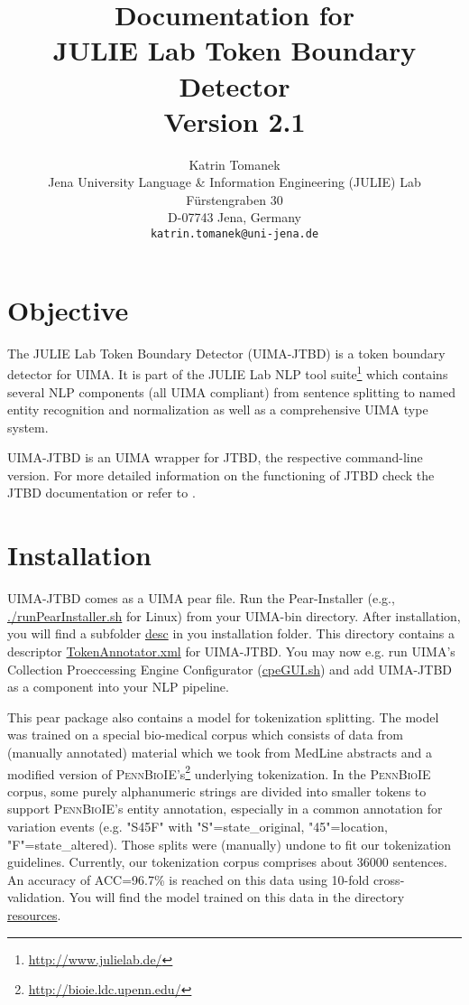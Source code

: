 \documentclass[11pt,a4paper,halfparskip]{scrartcl}
\title{\small{Documentation for}\\\huge JULIE Lab Token Boundary Detector\\\vspace{3mm}\small{Version 2.1}}
\author{\normalsize Katrin Tomanek\\
  \normalsize  Jena University Language \& Information Engineering (JULIE) Lab\\
  \normalsize F\"urstengraben 30 \\
  \normalsize D-07743 Jena, Germany\\
  {\normalsize \tt katrin.tomanek@uni-jena.de} }
\date{}
\begin{document}
\maketitle

\section{Objective}

The JULIE Lab Token Boundary Detector (UIMA-JTBD) is a token boundary
detector for UIMA.  It is part of the JULIE Lab NLP tool
suite\footnote{\url{http://www.julielab.de/}} which contains several
NLP components (all UIMA compliant) from sentence splitting to named
entity recognition and normalization as well as a comprehensive UIMA
type system.

UIMA-JTBD is an UIMA wrapper for JTBD, the respective command-line
version. For more detailed information on the functioning of JTBD
check the JTBD documentation or refer to \cite{Tomanek2007a}.

\section{Installation}

UIMA-JTBD comes as a UIMA pear file. Run the Pear-Installer (e.g.,
\url{./runPearInstaller.sh} for Linux) from your UIMA-bin directory.
After installation, you will find a subfolder \url{desc} in you
installation folder. This directory contains a descriptor
\url{TokenAnnotator.xml} for UIMA-JTBD. You may now e.g. run UIMA's
Collection Proeccessing Engine Configurator (\url{cpeGUI.sh}) and add
UIMA-JTBD as a component into your NLP pipeline.

This pear package also contains a model for tokenization splitting. The
model was trained on a special bio-medical corpus which consists of
data from (manually annotated) material which we took from MedLine
abstracts and a modified version of
\textsc{PennBioIE}'s\footnote{\url{http://bioie.ldc.upenn.edu/}}
underlying tokenization. In the \textsc{PennBioIE} corpus, some purely
alphanumeric strings are divided into smaller tokens to support
\textsc{PennBioIE}'s entity annotation, especially in a common
annotation for variation events (e.g.  "S45F" with
"S"=state\_original, "45"=location, "F"=state\_altered).  Those splits
were (manually) undone to fit our tokenization guidelines.  Currently,
our tokenization corpus comprises about 36000 sentences.  An accuracy
of ACC=96.7\% is reached on this data using 10-fold cross-validation.
You will find the model trained on this data in the directory
\url{resources}.
\end{document}
